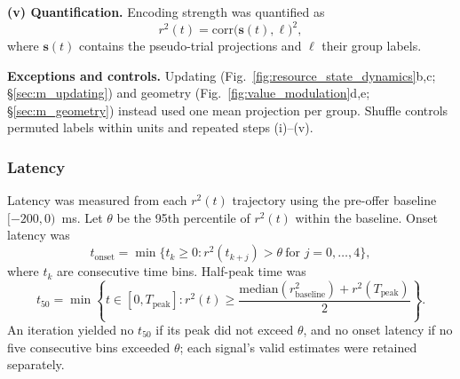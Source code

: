 \documentclass[pdflatex,sn-mathphys-num]{sn-jnl}%
\begin{document}
\textbf{(v) Quantification.} Encoding strength was quantified as
\begin{equation}
r^2(t)=\mathrm{corr}\bigl(\mathbf s(t),\boldsymbol\ell\bigr)^2,
\end{equation}
where $\mathbf s(t)$ contains the pseudo-trial projections and $\boldsymbol\ell$ their group labels.

\textbf{Exceptions and controls.} Updating (Fig.~\ref{fig:resource_state_dynamics}b,c; \S\ref{sec:m_updating}) and geometry (Fig.~\ref{fig:value_modulation}d,e; \S\ref{sec:m_geometry}) instead used one mean projection per group. Shuffle controls permuted labels within units and repeated steps (i)--(v).

\subsubsection{Latency}\label{sec:m_latency}
Latency was measured from each $r^2(t)$ trajectory using the pre-offer baseline $[-200,0)$~ms. Let $\theta$ be the 95th percentile of $r^2(t)$ within the baseline. Onset latency was
\begin{equation}
t_{\mathrm{onset}}=\min\{t_k\geq0:r^2(t_{k+j})>\theta\ \text{for }j=0,\ldots,4\},
\end{equation}
where $t_k$ are consecutive time bins. Half-peak time was
\begin{equation}
t_{50}=\min\left\{t\in[0,T_{\mathrm{peak}}]:r^2(t)\geq\frac{\mathrm{median}(r^2_{\mathrm{baseline}})+r^2(T_{\mathrm{peak}})}{2}\right\}.
\end{equation}
An iteration yielded no $t_{50}$ if its peak did not exceed $\theta$, and no onset latency if no five consecutive bins exceeded $\theta$; each signal's valid estimates were retained separately.
\end{document}
